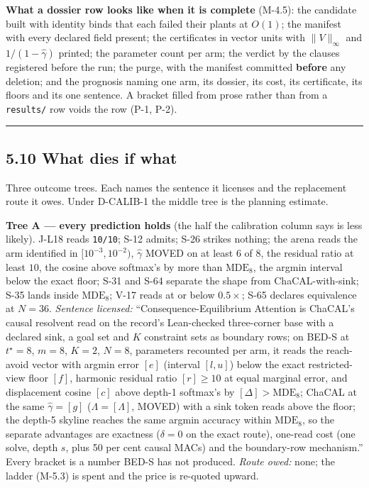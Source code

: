 \documentclass[11pt,a4paper]{article}
\newcounter{none}                 %
\theoremstyle{plain}
\theoremstyle{definition}
\theoremstyle{remark}
\begin{document}
\textbf{What a dossier row looks like when it is complete} (M-4.5): the
candidate built with identity binds that each failed their plants at
\(O(1)\); the manifest with every declared field present; the
certificates in vector units with \(\|V\|_\infty\) and
\(1/(1-\hat\gamma)\) printed; the parameter count per arm; the verdict
by the clauses registered before the run; the purge, with the manifest
committed \textbf{before} any deletion; and the prognosis naming one
arm, its dossier, its cost, its certificate, its floors and its one
sentence. A bracket filled from prose rather than from a
\texttt{results/} row voids the row (P-1, P-2).

\begin{center}\rule{0.5\linewidth}{0.5pt}\end{center}

\subsection{5.10 What dies if what}\label{what-dies-if-what}

Three outcome trees. Each names the sentence it licenses and the
replacement route it owes. Under D-CALIB-1 the middle tree is the
planning estimate.

\textbf{Tree A --- every prediction holds} (the half the calibration
column says is less likely). J-L18 reads \texttt{10/10}; S-12 admits;
S-26 strikes nothing; the arena reads the arm identified in
\([10^{-3},10^{-2})\), \(\hat\gamma\) MOVED on at least 6 of 8, the
residual ratio at least \(10\), the cosine above softmax's by more than
\(\mathrm{MDE}_8\), the argmin interval below the exact floor; S-31 and
S-64 separate the shape from ChaCAL-with-sink; S-35 lands inside
\(\mathrm{MDE}_8\); V-17 reads at or below \(0.5\times\); S-65 declares
equivalence at \(N=36\). \emph{Sentence licensed:}
``Consequence-Equilibrium Attention is ChaCAL's causal resolvent read on
the record's Lean-checked three-corner base with a declared sink, a goal
set and \(K\) constraint sets as boundary rows; on BED-S at
\(t^\star=8\), \(m=8\), \(K=2\), \(N=8\), parameters recounted per arm,
it reads the reach-avoid vector with argmin error \([e]\) (interval
\([l,u]\)) below the exact restricted-view floor \([f]\), harmonic
residual ratio \([r]\ge10\) at equal marginal error, and displacement
cosine \([c]\) above depth-1 softmax's by \([\Delta]>\mathrm{MDE}_8\);
ChaCAL at the same \(\hat\gamma=[g]\) (\(\Lambda=[\Lambda]\), MOVED)
with a sink token reads above the floor; the depth-5 skyline reaches the
same argmin accuracy within \(\mathrm{MDE}_8\), so the separate
advantages are exactness (\(\delta=0\) on the exact route), one-read
cost (one solve, depth \(s\), plus 50 per cent causal MACs) and the
boundary-row mechanism.'' Every bracket is a number BED-S has not
produced. \emph{Route owed:} none; the ladder (M-5.3) is spent and the
price is re-quoted upward.
\end{document}
